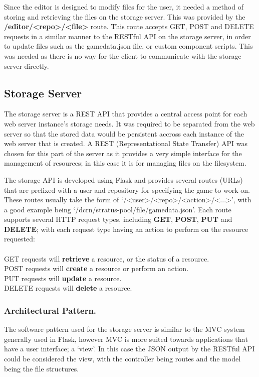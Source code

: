 	Since the editor is designed to modify files for the user, it needed a method of storing and retrieving the files on the storage server. This was provided by the \textbf{/editor/<repo>/<file>} route. This route accepts GET, POST and DELETE requests in a similar manner to the RESTful API on the storage server, in order to update files such as the gamedata.json file, or custom component scripts. This was needed as there is no way for the client to communicate with the storage server directly.

	\subsection{Storage Server}
	\label{subsection:devstorageserver}

	The storage server is a REST API that provides a central access point for each web server instance's storage needs. It was required to be separated from the web server so that the stored data would be persistent accross each instance of the web server that is created. A REST (Representational State Transfer) API was chosen for this part of the server as it provides a very simple interface for the management of resources; in this case it is for managing files on the filesystem. 

	The storage API is developed using Flask and provides several routes (URLs) that are prefixed with a user and repository for specifying the game to work on. These routes usually take the form of `/<user>/<repo>/<action>/<...>', with a good example being `/dcrn/stratus-pool/file/gamedata.json'. Each route supports several HTTP request types, including \textbf{GET}, \textbf{POST}, \textbf{PUT} and \textbf{DELETE}; with each request type having an action to perform on the resource requested:
	\\
	~\\
	GET requests will \textbf{retrieve} a resource, or the status of a resource.\\
	POST requests will \textbf{create} a resource or perform an action.\\
	PUT requests will \textbf{update} a resource.\\
	DELETE requests will \textbf{delete} a resource.\\

	\subsubsection{Architectural Pattern.}
	The software pattern used for the storage server is similar to the MVC system generally used in Flask, however MVC is more suited towards applications that have a user interface; a `view'. In this case the JSON output by the RESTful API could be considered the view, with the controller being routes and the model being the file structures.

